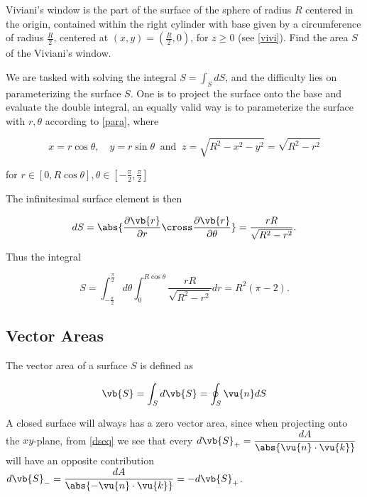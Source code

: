 \documentclass[english,a4paper,12pt]{report}
\begin{document}
{Viviani's window is the part of the surface of the sphere of radius \(R\) centered in the origin, contained within the right cylinder with base given by a circumference of radius \(\displaystyle \frac{R}{2} \), centered at \(\displaystyle (x,y) = \left(\frac{R}{2}, 0\right)\), for \(z \ge 0\) (see \cref{vivi}). Find the area \(S\) of the Viviani's window.}
{We are tasked with solving the integral \(S = \int_{S}^{} dS \), and the difficulty lies on parameterizing the surface \(S\). One is to project the surface onto the base and evaluate the double integral, an equally valid way is to parameterize the surface with \(r, \theta \) according to \cref{para}, where 

\begin{equation}
	x = r\cos \theta , \quad y = r\sin \theta ~\text { and }~ z = \sqrt{R^2 - x^2 - y^2} = \sqrt{R^2 - r^2}
\end{equation}

for \(\displaystyle r \in [0,R\cos \theta ], \theta \in \left[-\frac{\pi }{2}, \frac{\pi }{2}  \right]\) 

The infinitesimal surface element is then 

\begin{equation}
	dS = \abs{\frac{\partial \vb{r} }{\partial r} \cross \frac{\partial \vb{r} }{\partial \theta }  } = \frac{rR}{\sqrt{R^2-r^2} }. 
\end{equation}

Thus the integral

\begin{equation}
	S = \int_{-\frac{\pi }{2} }^{\frac{\pi }{2} }d \theta \int_{0}^{R\cos \theta }\frac{rR}{\sqrt{R^2 - r^2} }dr = R^2(\pi -2).     
\end{equation}



} 



\subsection{Vector Areas}

The vector area of a surface \(S\) is defined as

\begin{equation}
	\vb{S}  = \int_{S}^{} d\vb{S} = \oint_{S} \vu{n} dS
\end{equation}

A closed surface will always has a zero vector area, since when projecting onto the \(xy\)-plane, from \cref{dseq} we see that every \(\displaystyle d\vb{S} _{+}  = \frac{dA}{\abs{\vu{n} \cdot \vu{k} } } \) will have an opposite contribution \(\displaystyle d\vb{S} _{-} = \frac{dA}{\abs{- \vu{n} \cdot \vu{k} } } = -d\vb{S} _{+} \). 
\end{document}

